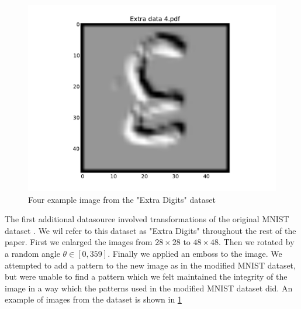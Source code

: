 \documentclass[conference]{IEEEtran}
\begin{document}
\begin{figure}[Extra Data]
	\includegraphics[scale=0.20]{Extradata4.pdf}
	\caption{Four example image from the "Extra Digits" dataset}
	\label{ExtraData}
\end{figure}

The first additional datasource involved transformations of the original MNIST dataset \cite{MNIST_Original}. We wil refer to this dataset as "Extra Digits" throughout the rest of the paper. First we enlarged the images from $28\times 28$ to $48\times 48$. Then we rotated by a random angle $\theta \in  [0,359]$. Finally we applied an emboss to the image. We attempted to add a pattern to the new image as in the modified MNIST dataset, but were unable to find a pattern which we felt maintained the integrity of the image in a way which the patterns used in the modified MNIST dataset did. An example of images from the dataset is shown in \ref{ExtraData}
\end{document}
